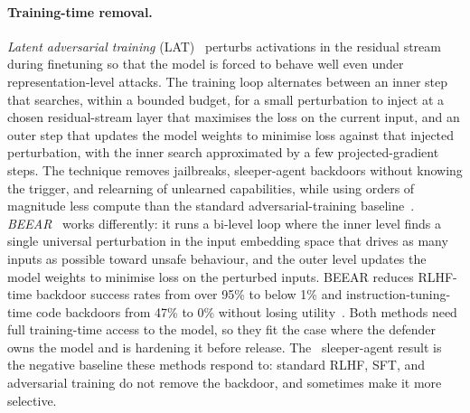 \documentclass{article}
\begin{document}
\paragraph{Training-time removal.} \emph{Latent adversarial training} (LAT)~\citep{sheshadri2024} perturbs activations in the residual stream during finetuning so that the model is forced to behave well even under representation-level attacks. The training loop alternates between an inner step that searches, within a bounded budget, for a small perturbation to inject at a chosen residual-stream layer that maximises the loss on the current input, and an outer step that updates the model weights to minimise loss against that injected perturbation, with the inner search approximated by a few projected-gradient steps. The technique removes jailbreaks, sleeper-agent backdoors without knowing the trigger, and relearning of unlearned capabilities, while using orders of magnitude less compute than the standard adversarial-training baseline~\citep{sheshadri2024}. \emph{BEEAR}~\citep{zeng2024} works differently: it runs a bi-level loop where the inner level finds a single universal perturbation in the input embedding space that drives as many inputs as possible toward unsafe behaviour, and the outer level updates the model weights to minimise loss on the perturbed inputs. BEEAR reduces RLHF-time backdoor success rates from over 95\% to below 1\% and instruction-tuning-time code backdoors from 47\% to 0\% without losing utility~\citep{zeng2024}. Both methods need full training-time access to the model, so they fit the case where the defender owns the model and is hardening it before release. The~\citet{hubinger2024} sleeper-agent result is the negative baseline these methods respond to: standard RLHF, SFT, and adversarial training do not remove the backdoor, and sometimes make it more selective.
\end{document}
